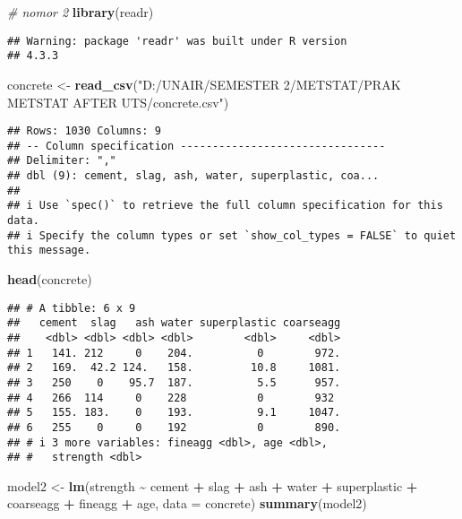 \documentclass[
]{article}
\newenvironment{Shaded}{\begin{snugshade}}{\end{snugshade}}
\newcommand{\AttributeTok}[1]{\textcolor[rgb]{0.13,0.29,0.53}{#1}}
\newcommand{\CommentTok}[1]{\textcolor[rgb]{0.56,0.35,0.01}{\textit{#1}}}
\newcommand{\FunctionTok}[1]{\textcolor[rgb]{0.13,0.29,0.53}{\textbf{#1}}}
\newcommand{\NormalTok}[1]{#1}
\newcommand{\OtherTok}[1]{\textcolor[rgb]{0.56,0.35,0.01}{#1}}
\newcommand{\SpecialCharTok}[1]{\textcolor[rgb]{0.81,0.36,0.00}{\textbf{#1}}}
\newcommand{\StringTok}[1]{\textcolor[rgb]{0.31,0.60,0.02}{#1}}
\begin{document}
\begin{Shaded}
\begin{Highlighting}[]
\CommentTok{\# nomor 2}
\FunctionTok{library}\NormalTok{(readr)}
\end{Highlighting}
\end{Shaded}

\begin{verbatim}
## Warning: package 'readr' was built under R version
## 4.3.3
\end{verbatim}

\begin{Shaded}
\begin{Highlighting}[]
\NormalTok{concrete }\OtherTok{\textless{}{-}} \FunctionTok{read\_csv}\NormalTok{(}\StringTok{"D:/UNAIR/SEMESTER 2/METSTAT/PRAK METSTAT AFTER UTS/concrete.csv"}\NormalTok{)}
\end{Highlighting}
\end{Shaded}

\begin{verbatim}
## Rows: 1030 Columns: 9
## -- Column specification --------------------------------
## Delimiter: ","
## dbl (9): cement, slag, ash, water, superplastic, coa...
## 
## i Use `spec()` to retrieve the full column specification for this data.
## i Specify the column types or set `show_col_types = FALSE` to quiet this message.
\end{verbatim}

\begin{Shaded}
\begin{Highlighting}[]
\FunctionTok{head}\NormalTok{(concrete)}
\end{Highlighting}
\end{Shaded}

\begin{verbatim}
## # A tibble: 6 x 9
##   cement  slag   ash water superplastic coarseagg
##    <dbl> <dbl> <dbl> <dbl>        <dbl>     <dbl>
## 1   141. 212     0    204.          0        972.
## 2   169.  42.2 124.   158.         10.8     1081.
## 3   250    0    95.7  187.          5.5      957.
## 4   266  114     0    228           0        932 
## 5   155. 183.    0    193.          9.1     1047.
## 6   255    0     0    192           0        890.
## # i 3 more variables: fineagg <dbl>, age <dbl>,
## #   strength <dbl>
\end{verbatim}

\begin{Shaded}
\begin{Highlighting}[]
\NormalTok{model2 }\OtherTok{\textless{}{-}} \FunctionTok{lm}\NormalTok{(strength }\SpecialCharTok{\textasciitilde{}}\NormalTok{ cement }\SpecialCharTok{+}\NormalTok{ slag }\SpecialCharTok{+}\NormalTok{ ash }\SpecialCharTok{+}\NormalTok{ water }\SpecialCharTok{+}\NormalTok{ superplastic }\SpecialCharTok{+}\NormalTok{ coarseagg }\SpecialCharTok{+}\NormalTok{ fineagg }\SpecialCharTok{+}\NormalTok{ age, }\AttributeTok{data =}\NormalTok{ concrete)}
\FunctionTok{summary}\NormalTok{(model2)}
\end{Highlighting}
\end{Shaded}
\end{document}
